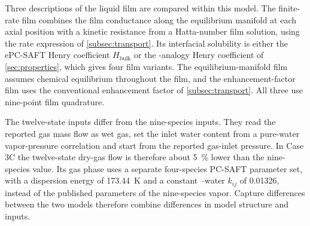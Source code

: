 Three descriptions of the liquid film are compared within this model.
The finite-rate film combines the film conductance along the equilibrium manifold at each axial position with a kinetic resistance from a Hatta-number film solution, using the rate expression of \cref{subsec:transport}.
Its interfacial \COtwo{} solubility is either the ePC-SAFT Henry coefficient $H_{\mathrm{bulk}}$ or the \NtwoO{}-analogy Henry coefficient of \cref{sec:properties}, which gives four film variants.
The equilibrium-manifold film assumes chemical equilibrium throughout the film, and the enhancement-factor film uses the conventional enhancement factor of \cref{subsec:transport}.
All three use nine-point film quadrature.

The twelve-state inputs differ from the nine-species inputs.
They read the reported gas mass flow as wet gas, set the inlet water content from a pure-water vapor-pressure correlation and start from the reported gas-inlet pressure.
In Case 3C the twelve-state dry-gas flow is therefore about \qty{5}{\percent} lower than the nine-species value.
Its gas phase uses a separate four-species PC-SAFT parameter set, with a \COtwo{} dispersion energy of \qty{173.44}{K} and a constant \COtwo--water $k_{ij}$ of \num{0.01326}, instead of the published parameters of the nine-species vapor.
Capture differences between the two models therefore combine differences in model structure and inputs.
